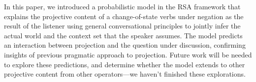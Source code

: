 
In this paper, we introduced a probabilistic model in the RSA framework 
 that explains the projective content of a change-of-state verbs under negation
 as the result of the listener using general conversational principles to jointly infer the actual world and the context set that the speaker assumes.
The model predicts an interaction between projection and the question under discussion, confirming 
 insights of previous pragmatic approach to projection. 
 Future work will be needed to explore these predictions, and determine whether the model extends to other projective content from other operators---we haven't finished these explorations.
 
 
